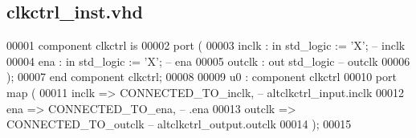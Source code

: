 \subsection{clkctrl\+\_\+inst.\+vhd}
\label{clkctrl__inst_8vhd_source}

\begin{DoxyCode}
00001     \textcolor{keywordflow}{component} clkctrl \textcolor{keywordflow}{is}
00002         \textcolor{keywordflow}{port} (
00003             inclk  : \textcolor{keywordflow}{in}  \textcolor{comment}{std\_logic} := 'X'; \textcolor{keyword}{-- inclk}
00004             ena    : \textcolor{keywordflow}{in}  \textcolor{comment}{std\_logic} := 'X'; \textcolor{keyword}{-- ena}
00005             outclk : \textcolor{keywordflow}{out} \textcolor{comment}{std\_logic}\textcolor{keyword}{         -- outclk}
00006         );
00007     \textcolor{keywordflow}{end} \textcolor{keywordflow}{component} \textcolor{vhdlchar}{clkctrl};
00008 
00009     u0 : \textcolor{keywordflow}{component} clkctrl
00010         \textcolor{keywordflow}{port} \textcolor{keywordflow}{map} (
00011             inclk  => CONNECTED\_TO\_inclk,\textcolor{keyword}{  --  altclkctrl\_input.inclk}
00012             ena    => CONNECTED\_TO\_ena,\textcolor{keyword}{    --                  .ena}
00013             outclk => CONNECTED\_TO\_outclk  \textcolor{keyword}{-- altclkctrl\_output.outclk}
00014         \textcolor{vhdlchar}{)};
00015 
\end{DoxyCode}
